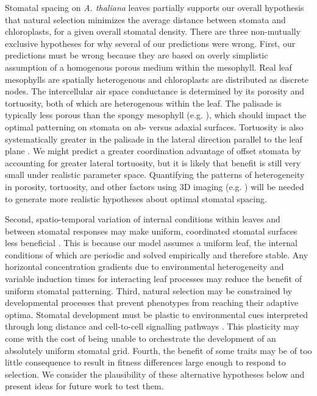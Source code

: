 \documentclass[webpdf,large,modern,unnumsec,namedate]{oup-authoring-template}
\begin{document}
Stomatal spacing on \emph{A. thaliana} leaves partially supports our
overall hypothesis that natural selection minimizes the average distance
between stomata and chloroplasts, for a given overall stomatal density.
There are three non-mutually exclusive hypotheses for why several of our
predictions were wrong. First, our predictions must be wrong because
they are based on overly simplistic assumption of a homogenous porous
medium within the mesophyll. Real leaf mesophylls are spatially
heterogenous and chloroplasts are distributed as discrete nodes. The
intercellular air space conductance is determined by its porosity and
tortuosity, both of which are heterogenous within the leaf. The palisade
is typically less porous than the spongy mesophyll (e.g.
\citet{therouxrancourt_bias_2017}), which should impact the optimal
patterning on stomata on ab- versus adaxial surfaces. Tortuosity is also
systematically greater in the palisade in the lateral direction parallel
to the leaf plane \citep{harwood_understanding_2021}. We might predict a
greater coordination advantage of offset stomata by accounting for
greater lateral tortuosity, but it is likely that benefit is still very
small under realistic parameter space. Quantifying the patterns of
heterogeneity in porosity, tortuosity, and other factors
\citep{earles_beyond_2018} using 3D imaging (e.g.
\citet{borsuk_structural_2022}) will be needed to generate more
realistic hypotheses about optimal stomatal spacing.

Second, spatio-temporal variation of internal conditions within leaves
and between stomatal responses may make uniform, coordinated stomatal
surfaces less beneficial
\citep{weyers_heterogeneity_1997, lawson_nature_1998, lawson_spatial_1999}.
This is because our model assumes a uniform leaf, the internal
conditions of which are periodic and solved empirically and therefore
stable. Any horizontal concentration gradients due to environmental
heterogeneity and variable induction times for interacting leaf
processes may reduce the benefit of uniform stomatal patterning. Third,
natural selection may be constrained by developmental processes that
prevent phenotypes from reaching their adaptive optima. Stomatal
development must be plastic to environmental cues interpreted through
long distance and cell-to-cell signalling pathways
\citep{pillitteri_mechanisms_2012}. This plasticity may come with the
cost of being unable to orchestrate the development of an absolutely
uniform stomatal grid. Fourth, the benefit of some traits may be of too
little consequence to result in fitness differences large enough to
respond to selection. We consider the plausibility of these alternative
hypotheses below and present ideas for future work to test them.
\end{document}
